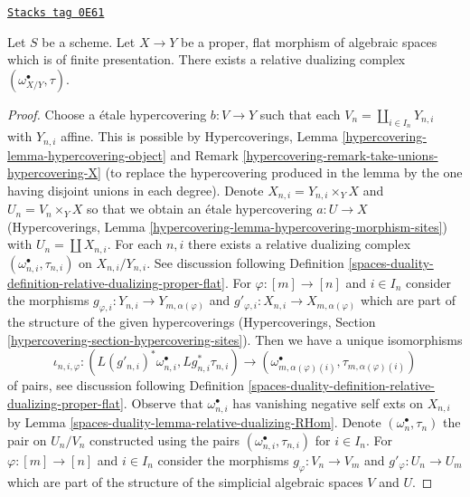 \begin{lemma}
\label{spaces-duality-lemma-existence-relative-dualizing}
\href{https://stacks.math.columbia.edu/tag/0E61}{\texttt{Stacks tag 0E61}}

Let $S$ be a scheme. Let $X \to Y$ be a proper, flat morphism of
algebraic spaces which is of finite presentation.
There exists a relative dualizing complex $(\omega_{X/Y}^\bullet, \tau)$.
\end{lemma}

\begin{proof}
Choose a \'etale hypercovering $b : V \to Y$ such that each
$V_n = \coprod_{i \in I_n} Y_{n, i}$ with $Y_{n, i}$ affine.
This is possible by Hypercoverings, Lemma
\ref{hypercovering-lemma-hypercovering-object} and
Remark \ref{hypercovering-remark-take-unions-hypercovering-X}
(to replace the hypercovering produced
in the lemma by the one having disjoint unions in each degree).
Denote $X_{n, i} = Y_{n, i} \times_Y X$ and $U_n = V_n \times_Y X$
so that we obtain an \'etale hypercovering
$a : U \to X$ (Hypercoverings, Lemma
\ref{hypercovering-lemma-hypercovering-morphism-sites})
with $U_n = \coprod X_{n, i}$.
For each $n, i$ there exists a relative dualizing complex
$(\omega_{n, i}^\bullet, \tau_{n, i})$ on $X_{n, i}/Y_{n, i}$.
See discussion following
Definition \ref{spaces-duality-definition-relative-dualizing-proper-flat}.
For $\varphi : [m] \to [n]$ and $i \in I_n$ consider the morphisms
$g_{\varphi, i} : Y_{n, i} \to Y_{m, \alpha(\varphi)}$ and
$g'_{\varphi, i} : X_{n, i} \to X_{m, \alpha(\varphi)}$
which are part of the structure of the given hypercoverings
(Hypercoverings, Section \ref{hypercovering-section-hypercovering-sites}).
Then we have a unique isomorphisms
$$
\iota_{n, i, \varphi} :
(L(g'_{n, i})^*\omega_{n, i}^\bullet, Lg_{n, i}^*\tau_{n, i})
\longrightarrow
(\omega_{m, \alpha(\varphi)(i)}^\bullet, \tau_{m, \alpha(\varphi)(i)})
$$
of pairs, see discussion following
Definition \ref{spaces-duality-definition-relative-dualizing-proper-flat}.
Observe that $\omega_{n, i}^\bullet$ has vanishing negative
self exts on $X_{n, i}$ by Lemma \ref{spaces-duality-lemma-relative-dualizing-RHom}.
Denote $(\omega_n^\bullet, \tau_n)$ the pair on $U_n/V_n$ constructed using
the pairs $(\omega_{n, i}^\bullet, \tau_{n, i})$ for $i \in I_n$.
For $\varphi : [m] \to [n]$ and $i \in I_n$ consider the morphisms
$g_\varphi : V_n \to V_m$ and $g'_\varphi : U_n \to U_m$ which are part
of the structure of the simplicial algebraic spaces $V$ and $U$.

\end{proof}
